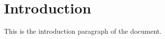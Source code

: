 \documentclass[12pt]{article}
\begin{document}
\section{Introduction}

This is the introduction paragraph of the document.




\end{document}
